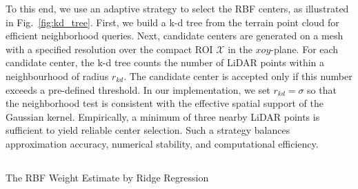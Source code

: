 \documentclass[journal,twoside,web]{ieeecolor}
\makeatletter
\let\origsubsection\subsection
\def\subsection{\@ifstar\subsectionstarcolor\subsectioncolorcmd}
\def\subsectioncolorcmd#1{\origsubsection{\textcolor{subsectioncolor}{#1}}}
\def\subsectionstarcolor#1{\origsubsection*{#1}}
\makeatother
\begin{document}
To this end, we use an adaptive strategy to select the RBF centers, as illustrated in Fig.~\ref{fig:kd_tree}. First, we build a k-d tree from the terrain point cloud for efficient neighborhood queries. Next, candidate centers are generated on a mesh with a specified resolution over the compact ROI $\mathcal{X}$ in the $xoy$-plane. For each candidate center, the k-d tree counts the number of LiDAR points within a neighbourhood of radius $r_{kd}$. The candidate center is accepted only if this number exceeds a pre-defined threshold. In our implementation, we set $r_{kd}=\sigma$ so that the neighborhood test is consistent with the effective spatial support of the Gaussian kernel. Empirically, a minimum of three nearby LiDAR points is sufficient to yield reliable center selection. Such a strategy balances approximation accuracy, numerical stability, and computational efficiency.

\subsection{The RBF Weight Estimate by Ridge Regression} \label{sec_LS}
\end{document}

